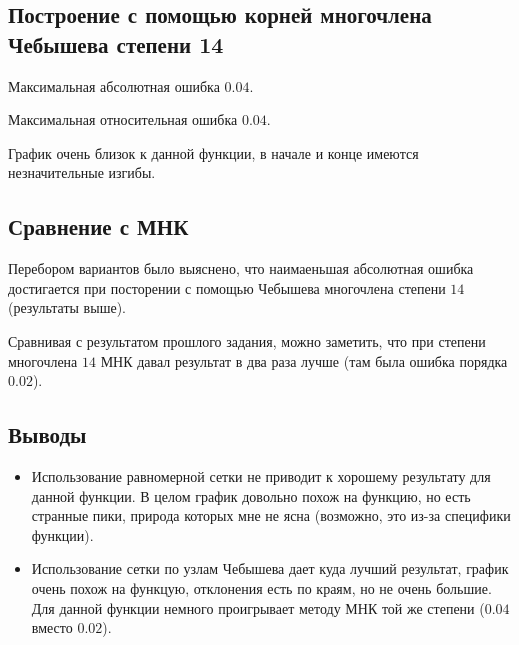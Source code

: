\documentclass[paper=a4, fontsize=11pt]{scrartcl} %
\numberwithin{equation}{section} %
\numberwithin{figure}{section} %
\numberwithin{table}{section} %
\begin{document}
\subsection{Построение с помощью корней многочлена Чебышева степени 14}

Максимальная абсолютная ошибка $0.04$. 

Максимальная относительная ошибка $0.04$.

График очень близок к данной функции, в начале и конце имеются незначительные изгибы.

\subsection {Сравнение с МНК}

Перебором вариантов было выяснено, что наимаеньшая абсолютная ошибка достигается при посторении с помощью Чебышева многочлена степени $14$ (результаты выше).

Сравнивая с результатом прошлого задания, можно заметить, что при степени многочлена $14$ МНК давал результат в два раза лучше (там была ошибка порядка $0.02$).

\subsection{Выводы}
\begin{itemize}
\item Использование равномерной сетки не приводит к хорошему результату для данной функции. В целом график довольно похож на функцию, но есть странные пики, природа которых мне не ясна (возможно, это из-за специфики функции).
\item Использование сетки по узлам Чебышева дает куда лучший результат, график очень похож на функцую, отклонения есть по краям, но не очень большие. Для данной функции немного проигрывает методу МНК той же степени ($0.04$ вместо $0.02$).
\end{itemize}
\end{document}
